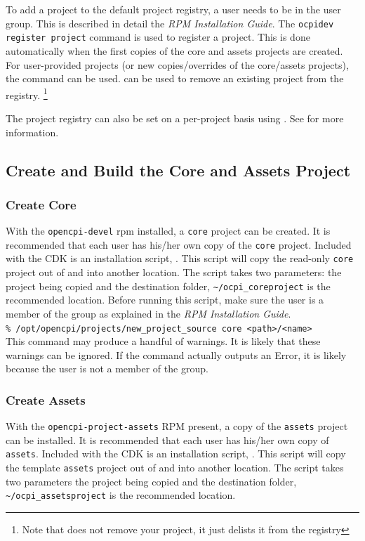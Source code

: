 To add a project to the default project registry, a user needs to be in the  user group.  This is described in detail the \textit{RPM Installation Guide}.  The \verb+ocpidev register project+ command is used to register a project. This is done automatically when the first copies of the core and assets projects are created. For user-provided projects (or new copies/overrides of the core/assets projects), the  command can be used.  can be used to remove an existing project from the registry. \footnote{Note that  does not remove your project, it just delists it from the registry}

The project registry can also be set on a per-project basis using . See  for more information.

\subsection{Create and Build the Core and Assets Project}
\subsubsection{Create Core}
With the \texttt{opencpi-devel} rpm installed, a \texttt{core} project can be created. It is recommended that each user has his/her own copy of the \texttt{core} project. Included with the CDK is an installation script,  . This script will copy the read-only \texttt{core} project out of  and into another location. The script takes two parameters: the project being copied and the destination folder, \verb+~/ocpi_coreproject+ is the recommended location. Before running this script, make sure the user is a member of the  group as explained in the \textit{RPM Installation Guide}.\\

\verb+% /opt/opencpi/projects/new_project_source core <path>/<name>+\\

This command may produce a handful of warnings. It is likely that these warnings can be ignored. If the command actually outputs an Error, it is likely because the user is not a member of the  group.

\subsubsection{Create Assets}
With the \texttt{opencpi-project-assets} RPM present, a copy of the \texttt{assets} project can be installed. It is recommended that each user has his/her own copy of \texttt{assets}. Included with the CDK is an installation script,  . This script will copy the template \texttt{assets} project out of  and into another location. The script takes two parameters the project being copied and the destination folder, \verb+~/ocpi_assetsproject+ is the recommended location.\\

